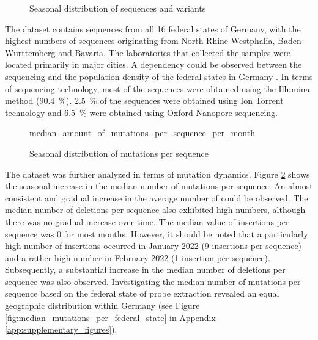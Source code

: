 \begin{figure}[ht!]
  \centering
    
  \caption{Seasonal distribution of sequences and variants}
\label{fig:variant_distribution}
\end{figure}

The dataset contains sequences from all 16 federal states of Germany, with the highest numbers of sequences originating from North Rhine-Westphalia, Baden-Württemberg and Bavaria. The laboratories that collected the samples were located primarily in major cities. A dependency could be observed between the sequencing and the population density of the federal states in Germany \cite{Dem1}. In terms of sequencing technology, most of the sequences were obtained using the Illumina method (90.4~\%). 2.5~\% of the sequences were obtained using Ion Torrent technology and 6.5~\% were obtained using Oxford Nanopore sequencing.

\begin{figure}[ht!]
  \centering
    
    {median_amount_of_mutations_per_sequence_per_month}
    \caption{Seasonal distribution of mutations per sequence}
\label{fig:median_amount_of_mutations_per_sequence_per_month}
\end{figure}

The dataset was further analyzed in terms of mutation dynamics.
Figure \ref{fig:median_amount_of_mutations_per_sequence_per_month} shows the seasonal increase in the median number of mutations per sequence. An almost consistent and gradual increase in the average number of  could be observed. The median number of deletions per sequence also exhibited high numbers, although there was no gradual increase over time. The median value of insertions per sequence was 0 for most months. However, it should be noted that a particularly high number of insertions occurred in January 2022 (9 insertions per sequence) and a rather high number in February 2022 (1 insertion per sequence). Subsequently, a substantial increase in the median number of deletions per sequence was also observed. Investigating the median number of mutations per sequence based on the federal state of probe extraction revealed an equal geographic distribution within Germany (see Figure \ref{fig:median_mutations_per_federal_state} in Appendix \ref{app:supplementary_figures}).

